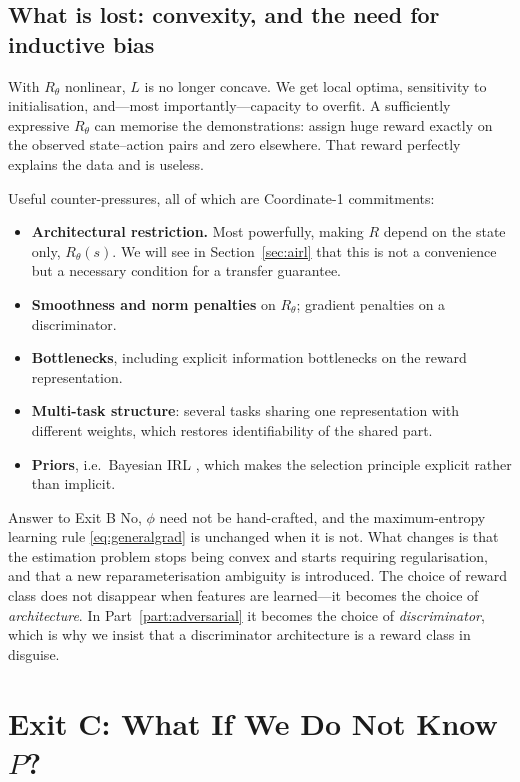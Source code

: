 \documentclass[11pt]{article}
\theoremstyle{plain}
\theoremstyle{definition}
\theoremstyle{remark}
\begin{document}
\subsection{What is lost: convexity, and the need for inductive bias}

With $R_\theta$ nonlinear, $L$ is no longer concave. We get local optima,
sensitivity to initialisation, and---most importantly---capacity to
overfit. A sufficiently expressive $R_\theta$ can memorise the
demonstrations: assign huge reward exactly on the observed state--action
pairs and zero elsewhere. That reward perfectly explains the data and is
useless.

Useful counter-pressures, all of which are Coordinate-1 commitments:

\begin{itemize}
\item \textbf{Architectural restriction.} Most powerfully, making $R$
depend on the state only, $R_\theta(s)$. We will see in
Section~\ref{sec:airl} that this is not a convenience but a necessary
condition for a transfer guarantee.
\item \textbf{Smoothness and norm penalties} on $R_\theta$; gradient
penalties on a discriminator.
\item \textbf{Bottlenecks}, including explicit information bottlenecks on
the reward representation.
\item \textbf{Multi-task structure}: several tasks sharing one
representation with different weights, which restores identifiability of
the shared part.
\item \textbf{Priors}, i.e.\ Bayesian IRL \cite{ramachandran2007}, which
makes the selection principle explicit rather than implicit.
\end{itemize}

\begin{graybox}{Answer to Exit B}
No, $\phi$ need not be hand-crafted, and the maximum-entropy learning rule
\eqref{eq:generalgrad} is unchanged when it is not. What changes is that
the estimation problem stops being convex and starts requiring
regularisation, and that a new reparameterisation ambiguity is
introduced. The choice of reward class does not disappear when features
are learned---it becomes the choice of \emph{architecture}. In
Part~\ref{part:adversarial} it becomes the choice of \emph{discriminator},
which is why we insist that a discriminator architecture is a reward
class in disguise.
\end{graybox}

\section{Exit C: What If We Do Not Know $P$?}
\label{sec:exitc}
\end{document}
